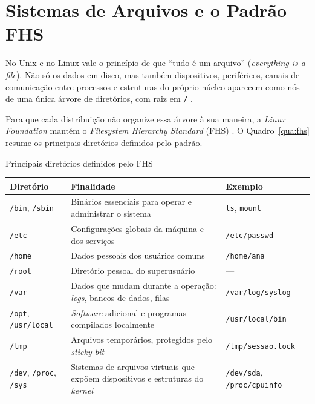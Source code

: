 \section{Sistemas de Arquivos e o Padrão FHS}
\label{sec:fhs}

No Unix e no Linux vale o princípio de que ``tudo é um arquivo'' (\textit{everything is a file}). Não só os dados em disco, mas também dispositivos, periféricos, canais de comunicação entre processos e estruturas do próprio núcleo aparecem como nós de uma única árvore de diretórios, com raiz em \texttt{/} \cite{nemeth2017unix, kerrisk2010linux}.

Para que cada distribuição não organize essa árvore à sua maneira, a \textit{Linux Foundation} mantém o \textit{Filesystem Hierarchy Standard} (FHS) \cite{fhs30}. O Quadro~\ref{qua:fhs} resume os principais diretórios definidos pelo padrão.

\begin{quadro}[htbp]
    \caption{Principais diretórios definidos pelo FHS}
    \label{qua:fhs}
    \footnotesize
    \begin{tabularx}{\textwidth}{|p{3.4cm}|L|p{3.6cm}|}
        \hline
        \textbf{Diretório} & \textbf{Finalidade} & \textbf{Exemplo} \\
        \hline
        \texttt{/bin}, \texttt{/sbin} & Binários essenciais para operar e administrar o sistema & \texttt{ls}, \texttt{mount} \\
        \hline
        \texttt{/etc} & Configurações globais da máquina e dos serviços & \texttt{/etc/passwd} \\
        \hline
        \texttt{/home} & Dados pessoais dos usuários comuns & \texttt{/home/ana} \\
        \hline
        \texttt{/root} & Diretório pessoal do superusuário & --- \\
        \hline
        \texttt{/var} & Dados que mudam durante a operação: \textit{logs}, bancos de dados, filas & \texttt{/var/log/syslog} \\
        \hline
        \texttt{/opt}, \texttt{/usr/local} & \textit{Software} adicional e programas compilados localmente & \texttt{/usr/local/bin} \\
        \hline
        \texttt{/tmp} & Arquivos temporários, protegidos pelo \textit{sticky bit} & \texttt{/tmp/sessao.lock} \\
        \hline
        \texttt{/dev}, \texttt{/proc}, \texttt{/sys} & Sistemas de arquivos virtuais que expõem dispositivos e estruturas do \textit{kernel} & \texttt{/dev/sda}, \texttt{/proc/cpuinfo} \\
        \hline
    \end{tabularx}
\end{quadro}

